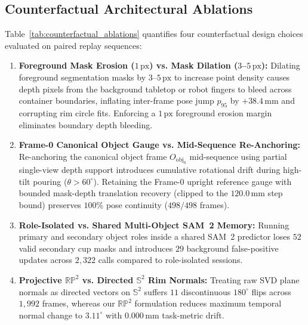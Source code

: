 \documentclass[10pt,journal]{IEEEtran}
\begin{document}
\subsection{Counterfactual Architectural Ablations}
Table~\ref{tab:counterfactual_ablations} quantifies four counterfactual design choices evaluated on paired replay sequences:
\begin{enumerate}
    \item \textbf{Foreground Mask Erosion ($1\,\mathrm{px}$) vs. Mask Dilation ($3$--$5\,\mathrm{px}$):} Dilating foreground segmentation masks by $3$--$5\,\mathrm{px}$ to increase point density causes depth pixels from the background tabletop or robot fingers to bleed across container boundaries, inflating inter-frame pose jump $p_{95}$ by $+38.4\,\mathrm{mm}$ and corrupting rim circle fits. Enforcing a $1\,\mathrm{px}$ foreground erosion margin eliminates boundary depth bleeding.
    \item \textbf{Frame-0 Canonical Object Gauge vs. Mid-Sequence Re-Anchoring:} Re-anchoring the canonical object frame $O_{\mathrm{obj}_0}$ mid-sequence using partial single-view depth support introduces cumulative rotational drift during high-tilt pouring ($\theta > 60^\circ$). Retaining the Frame-0 upright reference gauge with bounded mask-depth translation recovery (clipped to the $120.0\,\mathrm{mm}$ step bound) preserves $100\%$ pose continuity ($498/498$ frames).
    \item \textbf{Role-Isolated vs. Shared Multi-Object SAM~2 Memory:} Running primary and secondary object roles inside a shared SAM~2 predictor loses $52$ valid secondary cup masks and introduces $29$ background false-positive updates across $2{,}322$ calls compared to role-isolated sessions.
    \item \textbf{Projective $\mathbb{RP}^2$ vs. Directed $\mathbb{S}^2$ Rim Normals:} Treating raw SVD plane normals as directed vectors on $\mathbb{S}^2$ suffers $11$ discontinuous $180^\circ$ flips across $1{,}992$ frames, whereas our $\mathbb{RP}^2$ formulation reduces maximum temporal normal change to $3.11^\circ$ with $0.000\,\mathrm{mm}$ task-metric drift.
\end{enumerate}
\end{document}
